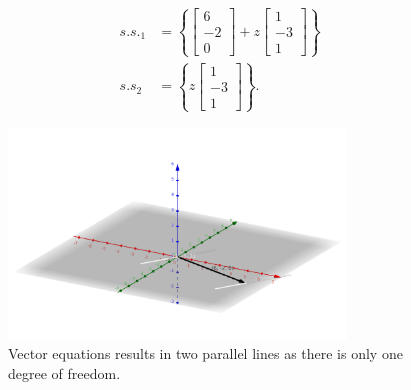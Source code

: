 \documentclass{zc-ust-hw}
\begin{document}
\begin{align}
  {s.s.}_1 &= \left\{ \begin{bmatrix} 6 \\ -2 \\ 0 \end{bmatrix} + z \begin{bmatrix} 1 \\ -3 \\ 1 \end{bmatrix} \right\} \\
  {s.s}_2 &= \left\{ z \begin{bmatrix} 1 \\ -3 \\ 1 \end{bmatrix} \right\} 
.\end{align}

\begin{figure}[htpb]
  \centering
  \includegraphics[width=0.8\textwidth]{vectors.png}
  \caption{Vector equations results in two parallel lines as there is only one degree of freedom.}
  \label{fig:vectors-png}
\end{figure}
\end{document}
